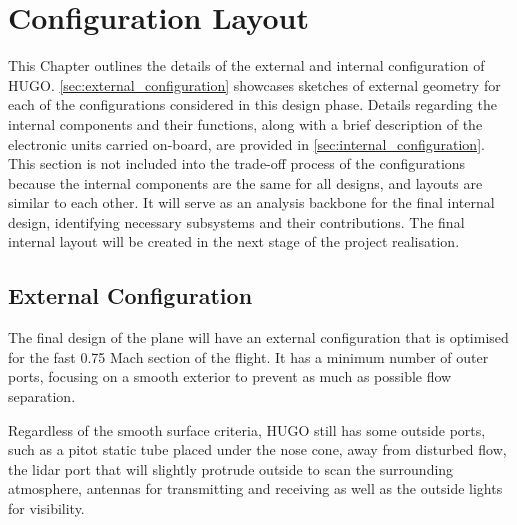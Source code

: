 \chapter{Configuration Layout}
\label{ch:configuration_layout}
This Chapter outlines the details of the external and internal configuration of HUGO. \autoref{sec:external_configuration} showcases sketches of external geometry for each of the configurations considered in this design phase. Details regarding the internal components and their functions, along with a brief description of the electronic units carried on-board, are provided in \autoref{sec:internal_configuration}.
This section is not included into the trade-off process of the configurations because the internal components are the same for all designs, and layouts are similar to each other. It will serve as an analysis backbone for the final internal design, identifying necessary subsystems and their contributions. The final internal layout will be created in the next stage of the project realisation.

\section{External Configuration}
\label{sec:external_configuration}
The final design of the plane will have an external configuration that is optimised for the fast 0.75 Mach section of the flight. It has a minimum number of outer ports, focusing on a smooth exterior to prevent as much as possible flow separation. 

Regardless of the smooth surface criteria, HUGO still has some outside ports, such as a pitot static tube placed under the nose cone, away from disturbed flow, the lidar port that will slightly protrude outside to scan the surrounding atmosphere, antennas for transmitting and receiving as well as the outside lights for visibility. 

